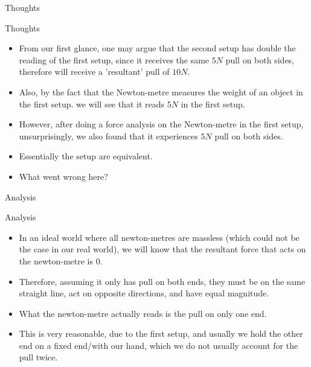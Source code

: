 \documentclass{beamer}
\begin{document}
    \begin{frame}{Thoughts}
        \begin{exampleblock}{Thoughts}
            \begin{itemize}
                \item From our first glance, one may argue that the second setup has double the reading of the first setup, since it receives the same $5 \si{N}$ pull on both sides, therefore will receive a 'resultant' pull of $10 \si{N}$.\pause
    
                \item Also, by the fact that the Newton-metre measures the weight of an object in the first setup. we will see that it reads $5 \si{N}$ in the first setup.\pause
        
                \item However, after doing a force analysis on the Newton-metre in the first setup, unsurprisingly, we also found that it experiences $5 \si{N}$ pull on both sides.\pause
    
                \item Essentially the setup are equivalent.\pause
    
                \item \alert{What went wrong here?}
            \end{itemize}
        \end{exampleblock}
    \end{frame}

    \begin{frame}{Analysis}
        \begin{exampleblock}{Analysis}
            \begin{itemize}
                \item In an ideal world where all newton-metres are massless (which could not be the case in our real world), we will know that the resultant force that acts on the newton-metre is $0$.\pause

                \item Therefore, assuming it only has pull on both ends, they must be on the same straight line, act on opposite directions, and have \alert{equal magnitude}.\pause

                \item What the newton-metre actually reads is the pull on \alert{only one end}.\pause
                
                \item This is very reasonable, due to the first setup, and usually we hold the other end on a fixed end/with our hand, which we do not usually account for the pull twice.
            \end{itemize}
            
        \end{exampleblock}
    \end{frame}
\end{document}
